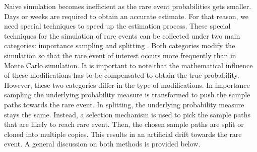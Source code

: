 Naive  simulation  becomes  inefficient  as  the  rare  event  probabilities  gets  smaller.   Days  or
weeks are required to obtain an accurate estimate. For that reason, we need special techniques
to  speed  up  the  estimation  process.   These  special  techniques  for  the  simulation  of  rare
events can be collected under two main categories:
importance sampling
and
splitting
.  Both
categories modify the simulation so that the rare event of interest occurs more frequently
than in Monte Carlo simulation.  It is important to note that the mathematical influence of
these modifications has to be compensated to obtain the true probability.  However, these
two categories differ in the type of modifications.  In importance sampling the underlying
probability  measure  is  transformed  to  push  the  sample  paths  towards  the  rare  event.   In
splitting, the underlying probability measure stays the same.  Instead, a selection mechanism
is used to pick the sample paths that are likely to reach rare event.  Then, the chosen sample
paths are split or cloned into multiple copies.  This results in an artificial drift towards the
rare event.  A general discussion on both methods is provided below.

